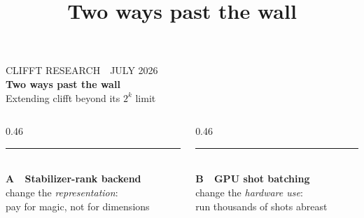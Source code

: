 \documentclass[aspectratio=169,11pt]{beamer}
\title{Two ways past the wall}
\author{}
\date{}
\begin{document}
\begin{frame}
  \vspace{1.6em}
  {\color{mutedink}\scriptsize CLIFFT RESEARCH \,\textperiodcentered\, JULY 2026}\\[0.8em]
  {\Huge\bfseries Two ways past the wall}\\[0.5em]
  {\large Extending clifft beyond its $2^k$ limit}\\[2.2em]
  \begin{columns}[T]
    \begin{column}{0.46\textwidth}
      {\color{copper}\rule{0.5\textwidth}{2.2pt}}\\[0.3em]
      {\bfseries A \,\textperiodcentered\, Stabilizer-rank backend}\\
      {\small\color{mutedink} change the \emph{representation}:\\ pay for magic, not for dimensions}
    \end{column}
    \begin{column}{0.46\textwidth}
      {\color{teal}\rule{0.5\textwidth}{2.2pt}}\\[0.3em]
      {\bfseries B \,\textperiodcentered\, GPU shot batching}\\
      {\small\color{mutedink} change the \emph{hardware use}:\\ run thousands of shots abreast}
    \end{column}
  \end{columns}
\end{frame}
\end{document}
